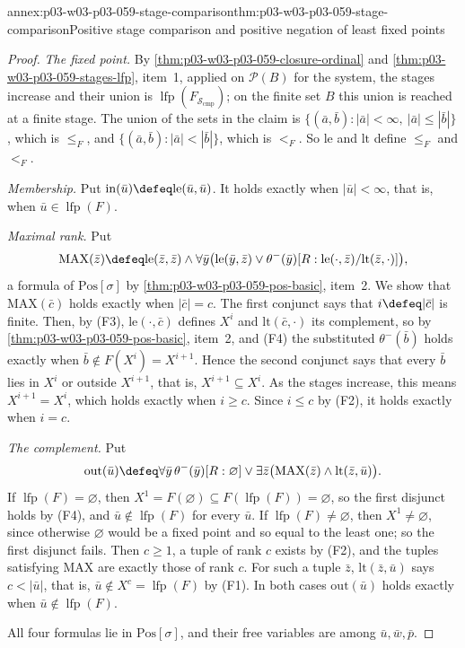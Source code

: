 \begin{annexitem}{annex:p03-w03-p03-059-stage-comparison}{thm:p03-w03-p03-059-stage-comparison}{Positive stage comparison and positive negation of least fixed points}
\begin{proof}
\emph{The fixed point.} By \cref{thm:p03-w03-p03-059-closure-ordinal} and
\cref{thm:p03-w03-p03-059-stages-lfp}, item~1, applied on \(\mathcal P(B)\)
for the system, the stages increase and their union is
\(\operatorname{lfp}(F_{\mathcal S_{\mathrm{cmp}}})\); on the finite set
\(B\) this union is reached at a finite stage. The union of the sets in the
claim is \(\{(\bar a,\bar b):|\bar a|<\infty,\ |\bar a|\leq|\bar b|\}\),
which is \(\le_F\), and \(\{(\bar a,\bar b):|\bar a|<|\bar b|\}\), which
is \(<_F\). So \(\mathrm{le}\) and \(\mathrm{lt}\) define \(\le_F\) and
\(<_F\).

\emph{Membership.} Put \(\mathrm{in}(\bar u)\defeq\mathrm{le}(\bar u,\bar
u)\). It holds exactly when \(|\bar u|<\infty\), that is, when \(\bar u\in
\operatorname{lfp}(F)\).

\emph{Maximal rank.} Put
\[
 \mathrm{MAX}(\bar z)\defeq\mathrm{le}(\bar z,\bar z)\land
 \forall\bar y\bigl(\mathrm{le}(\bar y,\bar z)\lor
 \theta^-(\bar y)[R:\mathrm{le}(\cdot,\bar z)/\mathrm{lt}(\bar z,\cdot)]\bigr),
\]
a formula of \(\mathrm{Pos}[\sigma]\) by
\cref{thm:p03-w03-p03-059-pos-basic}, item~2. We show that
\(\mathrm{MAX}(\bar c)\) holds exactly when \(|\bar c|=c\). The first
conjunct says that \(i\defeq|\bar c|\) is finite. Then, by (F3),
\(\mathrm{le}(\cdot,\bar c)\) defines \(X^i\) and
\(\mathrm{lt}(\bar c,\cdot)\) its complement, so by
\cref{thm:p03-w03-p03-059-pos-basic}, item~2, and (F4) the substituted
\(\theta^-(\bar b)\) holds exactly when \(\bar b\notin F(X^i)=X^{i+1}\).
Hence the second conjunct says that every \(\bar b\) lies in \(X^i\) or
outside \(X^{i+1}\), that is, \(X^{i+1}\subseteq X^i\). As the stages
increase, this means \(X^{i+1}=X^i\), which holds exactly when \(i\geq c\).
Since \(i\leq c\) by (F2), it holds exactly when \(i=c\).

\emph{The complement.} Put
\[
 \mathrm{out}(\bar u)\defeq\forall\bar y\,\theta^-(\bar y)[R:\varnothing]
 \lor\exists\bar z\bigl(\mathrm{MAX}(\bar z)\land\mathrm{lt}(\bar z,\bar u)\bigr).
\]
If \(\operatorname{lfp}(F)=\varnothing\), then
\(X^1=F(\varnothing)\subseteq F(\operatorname{lfp}(F))=\varnothing\), so the
first disjunct holds by (F4), and \(\bar u\notin\operatorname{lfp}(F)\)
for every \(\bar u\). If \(\operatorname{lfp}(F)\neq\varnothing\), then
\(X^1\neq\varnothing\), since otherwise \(\varnothing\) would be a fixed
point and so equal to the least one; so the first disjunct fails. Then
\(c\geq1\), a tuple of rank \(c\) exists by (F2), and the tuples
satisfying \(\mathrm{MAX}\) are exactly those of rank \(c\). For such a
tuple \(\bar z\), \(\mathrm{lt}(\bar z,\bar u)\) says \(c<|\bar u|\), that
is, \(\bar u\notin X^c=\operatorname{lfp}(F)\) by (F1). In both cases
\(\mathrm{out}(\bar u)\) holds exactly when
\(\bar u\notin\operatorname{lfp}(F)\).

All four formulas lie in \(\mathrm{Pos}[\sigma]\), and their free variables
are among \(\bar u,\bar w,\bar p\).
\end{proof}
\end{annexitem}

